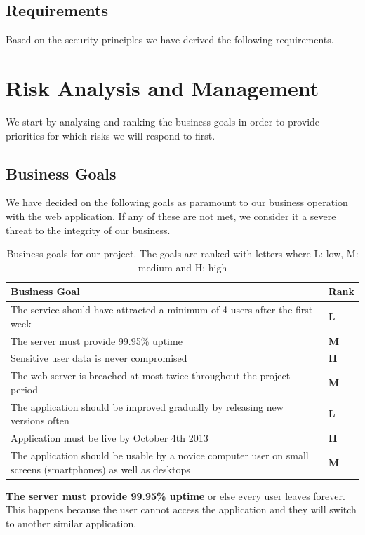 \documentclass[a4paper]{article}
\begin{document}
\subsection{Requirements}
Based on the security principles we have derived the following requirements.

\section{Risk Analysis and Management}

We start by analyzing and ranking the business goals in order to provide priorities for which risks we will respond to first.
\subsection{Business Goals}
We have decided on the following goals as paramount to our business operation with the web application. If any of these are not met, we consider it a severe threat to the integrity of our business.

\begin{table}[h!]
	\begin{tabular}{|p{10cm}|l|}
		\hline
		\textbf{Business Goal} & \textbf{Rank} \\ \hline
The service should have attracted a minimum of 4 users after the first week & \textbf{L} \\ \hline
The server must provide 99.95\% uptime   & \textbf{M} \\ \hline
Sensitive user data is never compromised & \textbf{H} \\ \hline
The web server is breached at most twice throughout the project period &  \textbf{M} \\ \hline
The application should be improved gradually by releasing new versions often & \textbf{L} \\ \hline
Application must be live by October 4th 2013 &	\textbf{H}\\ \hline
The application should be usable by a novice computer user on small screens (smartphones) as well as desktops & \textbf{M}\\ \hline
	\end{tabular}
	\caption{Business goals for our project. The goals are ranked with letters where L: low, M: medium and H: high}
	\label{tab:business_goals}
\end{table}

\textbf{The server must provide 99.95\% uptime} or else every user leaves forever. This happens because the user cannot access the application and they will switch to another similar application.
\end{document}

